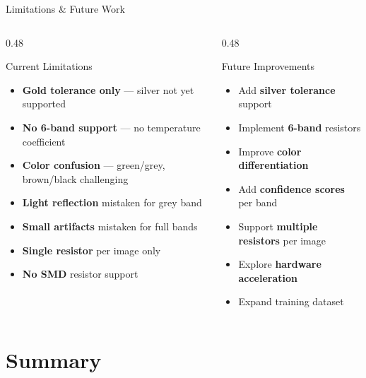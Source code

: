 \documentclass[aspectratio=169, 11pt]{beamer}
\newenvironment{compactitemize}{%
  \begin{itemize}\setlength{\itemsep}{1pt}\setlength{\parskip}{0pt}\setlength{\parsep}{0pt}%
}{\end{itemize}}
\begin{document}
\begin{frame}{Limitations \& Future Work}
\small
\begin{columns}[T]
\begin{column}{0.48\textwidth}
\begin{alertblock}{Current Limitations}
\small
\begin{compactitemize}
  \item \textbf{Gold tolerance only} --- silver not yet supported
  \item \textbf{No 6-band support} --- no temperature coefficient
  \item \textbf{Color confusion} --- green/grey, brown/black challenging
  \item \textbf{Light reflection} mistaken for grey band
  \item \textbf{Small artifacts} mistaken for full bands
  \item \textbf{Single resistor} per image only
  \item \textbf{No SMD} resistor support
\end{compactitemize}
\end{alertblock}
\end{column}
\begin{column}{0.48\textwidth}
\begin{exampleblock}{Future Improvements}
\small
\begin{compactitemize}
  \item Add \textbf{silver tolerance} support
  \item Implement \textbf{6-band} resistors
  \item Improve \textbf{color differentiation}
  \item Add \textbf{confidence scores} per band
  \item Support \textbf{multiple resistors} per image
  \item Explore \textbf{hardware acceleration}
  \item Expand training dataset
\end{compactitemize}
\end{exampleblock}
\end{column}
\end{columns}
\end{frame}

\section{Summary}
\end{document}
